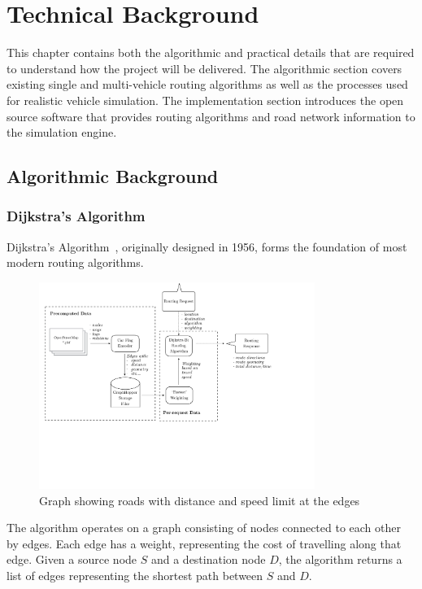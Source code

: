 \documentclass[ %
                    author={Alexander Hill},
                supervisor={Dr. Benjamin Sach},
                    degree={MEng},
                     title={MARMOSET},
                  subtitle={Multi-Agent Route Management using Online Simulation for Efficient Transportation},
                      type={research},
                      year={2016} ]{dissertation}
\begin{document}

\chapter{Technical Background}
\label{chap:technical}

This chapter contains both the algorithmic and practical details that are
required to understand how the project will be delivered. The algorithmic
section covers existing single and multi-vehicle routing algorithms as well as
the processes used for realistic vehicle simulation. The implementation section
introduces the open source software that provides routing algorithms and road
network information to the simulation engine.

\section{Algorithmic Background}

\subsection{Dijkstra's Algorithm}

Dijkstra's Algorithm~\cite{dijkstra}, originally designed in 1956, forms the
foundation of most modern routing algorithms.

\begin{figure}[h]
    \centering
    \includegraphics[page=7,clip,trim=0 10cm 12cm 0,width=0.8\textwidth]{architecture}
    \caption{Graph showing roads with distance and speed limit at the edges}\label{fig:graph-weights}
\end{figure}

The algorithm operates on a graph consisting of nodes connected to each other by
edges. Each edge has a weight, representing the cost of travelling along that
edge. Given a source node $S$ and a destination node $D$, the algorithm returns a list of edges
representing the shortest path between $S$ and $D$.
\end{document}
